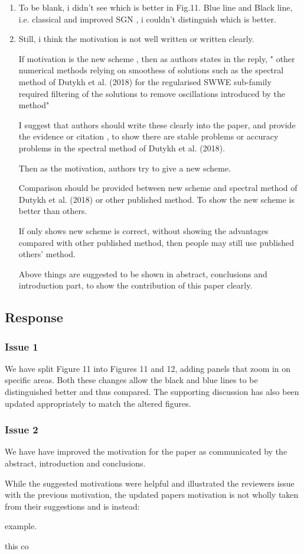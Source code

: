 \documentclass[10pt]{article}
\begin{document}
\begin{enumerate}
	\item To be blank, i didn't see which is better in Fig.11. 
	Blue line and Black line, 
	i.e. classical and improved SGN , 
	i couldn't distinguish which is better.
	\item  Still, i think the motivation is not well written or written clearly.
	
	If motivation is the new scheme ,
	then as authors states in the reply,
	" other numerical methods relying on smoothess of solutions such as the
	spectral method of Dutykh et al. (2018) for the regularised SWWE sub-family required filtering of the solutions to remove oscillations introduced
	by the method"
	
	I suggest that authors should write these clearly into the paper, and provide the evidence or citation , to show there are stable problems or accuracy problems in the
	spectral method of Dutykh et al. (2018).
	
	Then as the motivation, authors try to give a new scheme. 
	
	Comparison should be provided between new scheme and spectral method of Dutykh et al. (2018) or other published method.
	To show the new scheme is better than others.
	
	If only shows new scheme is correct, without showing the advantages compared with other published method, then people may still use published others' method.
	
	Above things are suggested to be shown in abstract, conclusions and introduction part, to show the contribution of this paper clearly.
\end{enumerate}



\subsection{Response}
\subsubsection{Issue 1}
We have split Figure 11 into Figures 11 and 12, adding panels that zoom in on specific areas. Both these changes allow the black and blue lines to be distinguished better and thus compared. The supporting discussion has also been updated appropriately to match the altered figures.

\subsubsection{Issue 2}
We have have improved the motivation for the paper as communicated by the abstract, introduction and conclusions. 

While the suggested motivations were helpful and illustrated the reviewers issue with the previous motivation, the updated papers motivation is not wholly taken from their suggestions and is instead:

example.

this co
\end{document}
